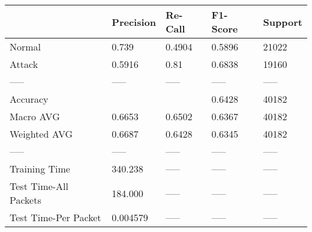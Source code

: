 \begin{tabular}{lllll}
\toprule
{} & Precision & Re-Call & F1-Score & Support \\
\midrule
Normal                &     0.739 &  0.4904 &   0.5896 &   21022 \\
Attack                &    0.5916 &    0.81 &   0.6838 &   19160 \\
-----                 &     ----- &   ----- &    ----- &   ----- \\
Accuracy              &           &         &   0.6428 &   40182 \\
Macro AVG             &    0.6653 &  0.6502 &   0.6367 &   40182 \\
Weighted AVG          &    0.6687 &  0.6428 &   0.6345 &   40182 \\
-----                 &     ----- &   ----- &    ----- &   ----- \\
Training Time         &   340.238 &   ----- &    ----- &   ----- \\
Test Time-All Packets &   184.000 &   ----- &    ----- &   ----- \\
Test Time-Per Packet  &  0.004579 &   ----- &    ----- &   ----- \\
\bottomrule
\end{tabular}
